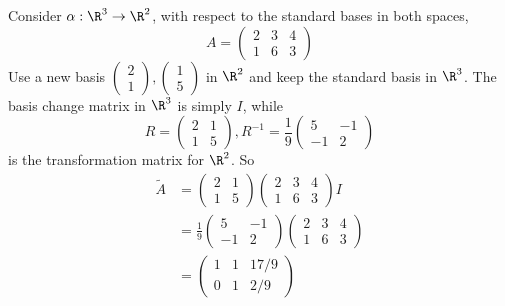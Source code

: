 \documentclass[a4paper]{article}
\begin{document}
  \begin{eg}
    Consider $\alpha: \R^3 \to \R^2$, with respect to the standard bases in both spaces,
    \[
      A = 
      \begin{pmatrix}
        2 & 3 & 4\\
        1 & 6 & 3
      \end{pmatrix}
    \]
    Use a new basis $
    \begin{pmatrix}
      2\\1
    \end{pmatrix}, 
    \begin{pmatrix}
      1\\5
    \end{pmatrix}$ in $\R^2$ and keep the standard basis in $\R^3$. The basis change matrix in $\R^3$ is simply $I$, while
    \[
      R = 
      \begin{pmatrix}
        2& 1\\
        1 & 5
      \end{pmatrix}, R^{-1} = \frac{1}{9}
      \begin{pmatrix}
        5 & -1\\
        -1 & 2
      \end{pmatrix}
    \]
    is the transformation matrix for $\R^2$. So
    \begin{align*}
      \tilde{A} &= 
      \begin{pmatrix}
        2 & 1\\1 & 5
      \end{pmatrix}
      \begin{pmatrix}
        2 & 3 & 4\\1 & 6 & 3
      \end{pmatrix}I\\
      &= \frac{1}{9}
      \begin{pmatrix}
        5 & -1\\
        -1 & 2
      \end{pmatrix}
      \begin{pmatrix}
        2 & 3 & 4\\1 & 6 & 3
      \end{pmatrix}\\
      &= 
      \begin{pmatrix}
        1 & 1 & 17/9\\
        0 & 1 & 2/9
      \end{pmatrix}
    \end{align*}


\end{eg}
\end{document}
